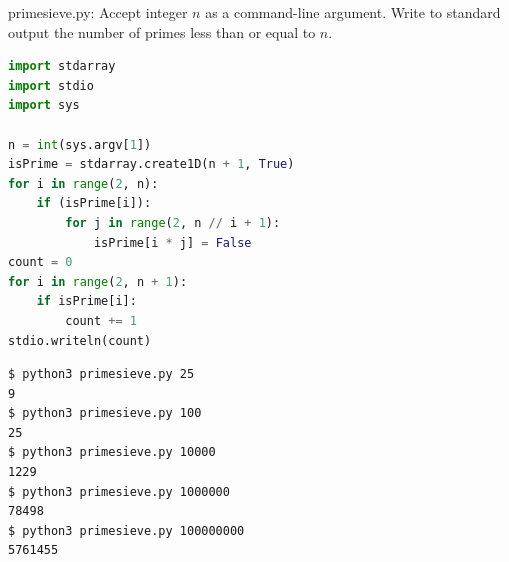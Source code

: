 \documentclass[8pt,a4paper,compress]{beamer}
\begin{document}
\begin{frame}[fragile]
\pause

\begin{framed}
\tiny primesieve.py: Accept integer $n$ as a command-line argument. Write to standard output the number of primes less than or equal to $n$.
\end{framed}

\begin{minipage}{160pt}
\begin{lstlisting}[language=Python]
import stdarray
import stdio
import sys

n = int(sys.argv[1])
isPrime = stdarray.create1D(n + 1, True)
for i in range(2, n):
    if (isPrime[i]):
        for j in range(2, n // i + 1):
            isPrime[i * j] = False
count = 0
for i in range(2, n + 1):
    if isPrime[i]:
        count += 1
stdio.writeln(count)
\end{lstlisting}

\end{minipage}%
\begin{minipage}{140pt}
\hfill {}
\end{minipage}

\pause

\begin{lstlisting}[language={}]
$ python3 primesieve.py 25
9
$ python3 primesieve.py 100
25
$ python3 primesieve.py 10000
1229
$ python3 primesieve.py 1000000
78498
$ python3 primesieve.py 100000000
5761455
\end{lstlisting}
\end{frame}
\end{document}
